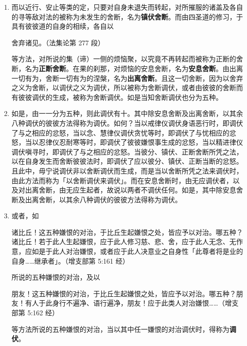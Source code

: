 \begin{enumerate}
\item 而以近行、安止等类的定，只要对自身未退失而转起，对所摧服的诸盖及各自的寻等敌对法的被称为未发生的舍断，名为\textbf{镇伏舍断}。而由四圣道的修习，于具有彼彼道的自身的相续，各自以\begin{quoting}舍弃诸见。（法集论第 277 段）\end{quoting}等方法，对所说的集（谛）一侧的烦恼聚，以究竟不再转起而被称为正断的舍断，名为\textbf{正断舍断}。在果的刹那，对烦恼的安息舍断，名为\textbf{安息舍断}。由出离一切有为，舍断一切有为的涅槃，名为\textbf{出离舍断}。且这一切舍断，因为以舍弃之义为舍断，以调伏之义为调伏，所以被称为舍断调伏，或者由彼彼的舍断而有彼彼调伏的生成，被称为舍断调伏。如是当知舍断调伏也分为五种。
\item 如是，由一一分为五种，则此调伏有十。其中除安息舍断及出离舍断，以其余八种调伏的彼彼方法得称为调伏。如何？当以戒律仪调伏身语恶行时，即调伏了与之相应的忿怒，当以念、慧律仪调伏贪忧等时，即调伏了与忧相应的忿怒，当以忍律仪忍耐寒等时，即调伏了彼彼嫌恨事生成的忿怒，当以精进律仪调伏嗔寻时，即调伏了与之相应的忿怒。当彼分、镇伏、正断舍断所凭之法，以在自身发生而舍断彼彼法时，即调伏了应以彼分、镇伏、正断当断的忿怒。且此中，毋宁说调伏非以舍断调伏而生成，而是当以舍断所凭之法来调伏时，由此方法而称为「以舍断调伏来调伏」。而在安息舍断时，由无应调伏者，以及对出离舍断，由无应生起者，故说以两者不调伏任何。如是，其中除安息舍断及出离舍断，以其余八种调伏的彼彼方法得称为调伏。
\item 或者，如\begin{quoting}诸比丘！这五种嫌恨的对治，于比丘生起嫌恨之处，皆应予以对治。哪五种？诸比丘！若于此人生起嫌恨，应于此人修习慈、悲、舍，应于此人无念、无作意，应如是于此人对治嫌恨，或者应于此人决意业之自身性「此尊者将是业的自身……继承者」。（增支部第 5:161 经）\end{quoting}所说的五种嫌恨的对治，及以\begin{quoting}朋友！这五种嫌恨的对治，于比丘生起嫌恨之处，皆应予以对治。哪五种？朋友！有人于此身行不遍净、语行遍净，朋友！应于此类人对治嫌恨……（增支部第 5:162 经）\end{quoting}等方法所说的五种嫌恨的对治，当以其中任一嫌恨的对治调伏时，得称为\textbf{调伏}。

\end{enumerate}
